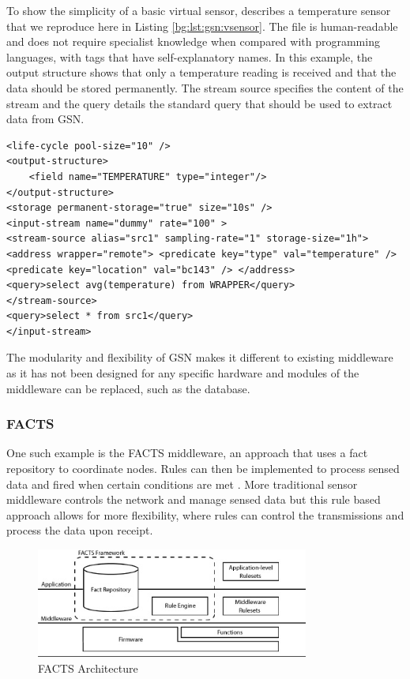 To show the simplicity of a basic virtual sensor, \cite{Aberer2007} describes a temperature sensor that we reproduce here in Listing \ref{bg:lst:gsn:vsensor}. The file is human-readable and does not require specialist knowledge when compared with programming languages, with tags that have self-explanatory names. In this example, the output structure shows that only a temperature reading is received and that the data should be stored permanently. The stream source specifies the content of the stream and the query details the standard query that should be used to extract data from GSN.
\vspace{\baselineskip}
\begin{lstlisting}[caption={Example Virtual Sensor},label={bg:lst:gsn:vsensor}]
<life-cycle pool-size="10" />
<output-structure> 
	<field name="TEMPERATURE" type="integer"/> 
</output-structure>
<storage permanent-storage="true" size="10s" /> 
<input-stream name="dummy" rate="100" > 
<stream-source alias="src1" sampling-rate="1" storage-size="1h">
<address wrapper="remote"> <predicate key="type" val="temperature" /> <predicate key="location" val="bc143" /> </address> 
<query>select avg(temperature) from WRAPPER</query>
</stream-source>
<query>select * from src1</query> 
</input-stream>

\end{lstlisting}

The modularity and flexibility of GSN makes it different to existing middleware as it has not been designed for any specific hardware and modules of the middleware can be replaced, such as the database. 

	\subsubsection{FACTS}
		One such example is the FACTS middleware, an approach that uses a fact repository to coordinate nodes. Rules can then be implemented to process sensed data and fired when certain conditions are met \cite{Terfloth2006}. More traditional sensor middleware controls the network and manage sensed data but this rule based approach allows for more flexibility, where rules can control the transmissions and process the data upon receipt.

		\begin{figure}[h]
		\centering
		\includegraphics[width=0.8\textwidth]{Chap2/figures/facts_architecture.jpg}
		\caption{FACTS Architecture \cite{Terfloth2006}}
		\label{bg:fig:facts}
		\end{figure}

